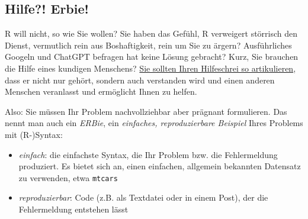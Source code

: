 \documentclass[
  letterpaper,
  oneside,
  open=any]{scrbook}
\providecommand{\tightlist}{%
  \setlength{\itemsep}{0pt}\setlength{\parskip}{0pt}}\usepackage{longtable,booktabs,array}
\theoremstyle{definition}
\theoremstyle{definition}
\theoremstyle{definition}
\theoremstyle{remark}
\begin{document}
\subsection{Hilfe?! Erbie!}\label{sec-erbie}

R will nicht, so wie Sie wollen? Sie haben das Gefühl, R verweigert
störrisch den Dienst, vermutlich rein aus Boshaftigkeit, rein um Sie zu
ärgern? Ausführliches Googeln und ChatGPT befragen hat keine Lösung
gebracht? Kurz, Sie brauchen die Hilfe eines kundigen Menschens?
\href{https://data-se.netlify.app/2022/01/31/erbie-einfache-reproduzierbare-beispiele-ihres-problems-mit-r-syntax/}{Sie
sollten Ihren Hilfeschrei so artikulieren}, dass er nicht nur gehört,
sondern auch verstanden wird und einen anderen Menschen veranlasst und
ermöglicht Ihnen zu helfen.

Also: Sie müssen Ihr Problem nachvollziehbar aber prägnant formulieren.
Das nennt man auch ein \emph{ERBie}, ein \emph{einfaches,
reproduzierbare Beispiel} Ihres Problems mit (R-)Syntax:

\begin{itemize}
\tightlist
\item
  \emph{einfach}: die einfachste Syntax, die Ihr Problem bzw. die
  Fehlermeldung produziert. Es bietet sich an, einen einfachen,
  allgemein bekannten Datensatz zu verwenden, etwa \texttt{mtcars}
\item
  \emph{reproduzierbar}: Code (z.B. als Textdatei oder in einem Post),
  der die Fehlermeldung entstehen lässt
\end{itemize}
\end{document}
